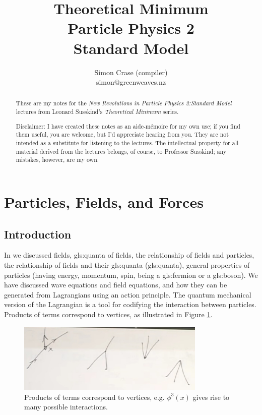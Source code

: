 \documentclass[]{article}
\title{Theoretical Minimum\\Particle Physics 2\\Standard Model}
\author{Simon Crase (compiler)\\simon@greenweaves.nz}
\begin{document}
\maketitle

\begin{abstract}
	These are my notes for the \emph{New Revolutions in Particle Physics 2:Standard Model} lectures from Leonard Susskind's \emph{Theoretical Minimum} series\cite{susskind2007theoretical}.
	
	Disclaimer: I have created these notes as an aide-m\'emoire for my own use; if you find them useful, you are welcome, but I'd appreciate hearing from you. They are not intended as a substitute for listening to the lectures. The intellectual property for all material derived from the lectures belongs, of course, to Professor Susskind; any mistakes, however, are my own.
\end{abstract}

\tableofcontents
\listoffigures
\listoftables
\listoftheorems

\section{Particles, Fields, and Forces}

\subsection{Introduction}

In  \cite[Particle Physics 1: Basic Concepts]{susskind2007theoretical} we discussed fields, \gls{gls:quanta} of  fields, the relationship of fields and particles, the relationship of fields and their \gls{gls:quanta} (\glsdesc{gls:quanta}), general properties of particles (having energy, momentum, spin, being a \gls{gls:fermion} or a \gls{gls:boson}). We have discussed wave equations and field equations, and how they can be generated from Lagrangians using an action principle. The quantum mechanical version of  the Lagrangian is a tool for codifying the interaction between particles. Products of terms correspond to vertices, as illustrated in Figure \ref{fig:phi:3:x}.
\begin{figure}[H]
	\caption[Products of terms correspond to vertices]{Products of terms correspond to vertices, e.g. $\phi^3(x)$ gives rise to many possible interactions.}\label{fig:phi:3:x}
	\includegraphics[width=0.8\textwidth]{phi-3-x}
\end{figure}
\end{document}
